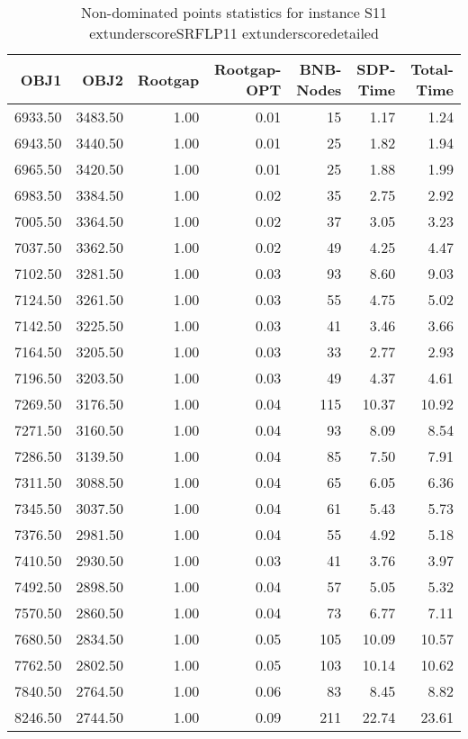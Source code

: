 \begin{table}
\caption{Non-dominated points statistics for instance S11	extunderscoreSRFLP11	extunderscoredetailed}
\label{tab:stats/S11_SRFLP11_detailed}
\begin{tabular}{rrrrrrr}
\toprule
OBJ1 & OBJ2 & Rootgap & Rootgap-OPT & BNB-Nodes & SDP-Time & Total-Time \\
\midrule
6933.50 & 3483.50 & 1.00 & 0.01 & 15 & 1.17 & 1.24 \\
6943.50 & 3440.50 & 1.00 & 0.01 & 25 & 1.82 & 1.94 \\
6965.50 & 3420.50 & 1.00 & 0.01 & 25 & 1.88 & 1.99 \\
6983.50 & 3384.50 & 1.00 & 0.02 & 35 & 2.75 & 2.92 \\
7005.50 & 3364.50 & 1.00 & 0.02 & 37 & 3.05 & 3.23 \\
7037.50 & 3362.50 & 1.00 & 0.02 & 49 & 4.25 & 4.47 \\
7102.50 & 3281.50 & 1.00 & 0.03 & 93 & 8.60 & 9.03 \\
7124.50 & 3261.50 & 1.00 & 0.03 & 55 & 4.75 & 5.02 \\
7142.50 & 3225.50 & 1.00 & 0.03 & 41 & 3.46 & 3.66 \\
7164.50 & 3205.50 & 1.00 & 0.03 & 33 & 2.77 & 2.93 \\
7196.50 & 3203.50 & 1.00 & 0.03 & 49 & 4.37 & 4.61 \\
7269.50 & 3176.50 & 1.00 & 0.04 & 115 & 10.37 & 10.92 \\
7271.50 & 3160.50 & 1.00 & 0.04 & 93 & 8.09 & 8.54 \\
7286.50 & 3139.50 & 1.00 & 0.04 & 85 & 7.50 & 7.91 \\
7311.50 & 3088.50 & 1.00 & 0.04 & 65 & 6.05 & 6.36 \\
7345.50 & 3037.50 & 1.00 & 0.04 & 61 & 5.43 & 5.73 \\
7376.50 & 2981.50 & 1.00 & 0.04 & 55 & 4.92 & 5.18 \\
7410.50 & 2930.50 & 1.00 & 0.03 & 41 & 3.76 & 3.97 \\
7492.50 & 2898.50 & 1.00 & 0.04 & 57 & 5.05 & 5.32 \\
7570.50 & 2860.50 & 1.00 & 0.04 & 73 & 6.77 & 7.11 \\
7680.50 & 2834.50 & 1.00 & 0.05 & 105 & 10.09 & 10.57 \\
7762.50 & 2802.50 & 1.00 & 0.05 & 103 & 10.14 & 10.62 \\
7840.50 & 2764.50 & 1.00 & 0.06 & 83 & 8.45 & 8.82 \\
8246.50 & 2744.50 & 1.00 & 0.09 & 211 & 22.74 & 23.61 \\

\end{tabular}
\end{table}
